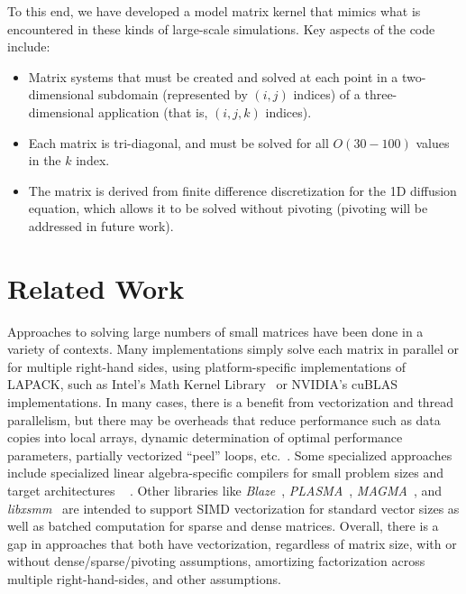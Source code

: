 \documentclass[conference]{IEEEtran}
\begin{document}
To this end, we have developed a model matrix kernel that mimics what
  is encountered in these kinds of large-scale simulations.
Key aspects of the code include:
\begin{itemize}
\item Matrix systems that must be created and solved
  at each point in a two-dimensional subdomain (represented by $(i,j)$ indices)
  of a three-dimensional application (that is, $(i,j,k)$ indices).
\item Each matrix is tri-diagonal, and must be solved for all $O(30-100)$
  values in the $k$ index.
\item The matrix is derived from finite difference discretization for the
  1D diffusion equation, which allows it to be solved without pivoting
  (pivoting will be addressed in future work).
\end{itemize}

\section{Related Work}
Approaches to solving large numbers of small matrices have been done
  in a variety of contexts.
Many implementations simply solve each matrix in parallel or for multiple
  right-hand sides, using platform-specific
  implementations of LAPACK, such as Intel's Math Kernel Library~\cite{mkl_website}
  or NVIDIA's cuBLAS~\cite{cublas_website} implementations.
In many cases, there is a benefit from vectorization and thread parallelism, 
  but there may be overheads that reduce performance such as data copies
  into local arrays, dynamic determination of optimal performance parameters, 
  partially vectorized ``peel'' loops, etc.~\cite{??}.
Some specialized approaches include specialized linear algebra-specific 
  compilers for small problem sizes and target architectures 
 ~\cite{Spampinato:2014, ??} .
Other libraries like 
  \emph{Blaze}~\cite{BlazeSite}, 
  \emph{PLASMA}~\cite{PLASMASite},
  \emph{MAGMA}~\cite{Haidar:2015}, and 
  \emph{libxsmm}~\cite{libxsmm_website}
  are intended to support SIMD vectorization for standard vector sizes
  as well as batched computation for sparse and dense matrices.
Overall, there is a gap in approaches that both have vectorization,
  regardless of matrix size, with or without dense/sparse/pivoting 
  assumptions, amortizing factorization across multiple right-hand-sides, 
  and other assumptions.
\\
\end{document}
